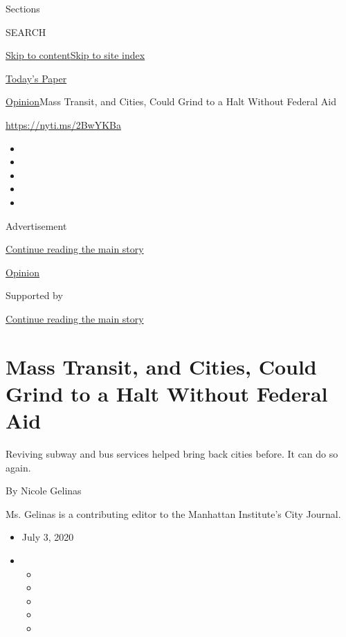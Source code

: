 Sections

SEARCH

\protect\hyperlink{site-content}{Skip to
content}\protect\hyperlink{site-index}{Skip to site index}

\href{https://myaccount.nytimes3xbfgragh.onion/auth/login?response_type=cookie\&client_id=vi}{}

\href{https://www.nytimes3xbfgragh.onion/section/todayspaper}{Today's
Paper}

\href{/section/opinion}{Opinion}\textbar{}Mass Transit, and Cities,
Could Grind to a Halt Without Federal Aid

\url{https://nyti.ms/2BwYKBa}

\begin{itemize}
\item
\item
\item
\item
\item
\end{itemize}

Advertisement

\protect\hyperlink{after-top}{Continue reading the main story}

\href{/section/opinion}{Opinion}

Supported by

\protect\hyperlink{after-sponsor}{Continue reading the main story}

\hypertarget{mass-transit-and-cities-could-grind-to-a-halt-without-federal-aid}{%
\section{Mass Transit, and Cities, Could Grind to a Halt Without Federal
Aid}\label{mass-transit-and-cities-could-grind-to-a-halt-without-federal-aid}}

Reviving subway and bus services helped bring back cities before. It can
do so again.

By Nicole Gelinas

Ms. Gelinas is a contributing editor to the Manhattan Institute's City
Journal.

\begin{itemize}
\item
  July 3, 2020
\item
  \begin{itemize}
  \item
  \item
  \item
  \item
  \item
  \end{itemize}
\end{itemize}


